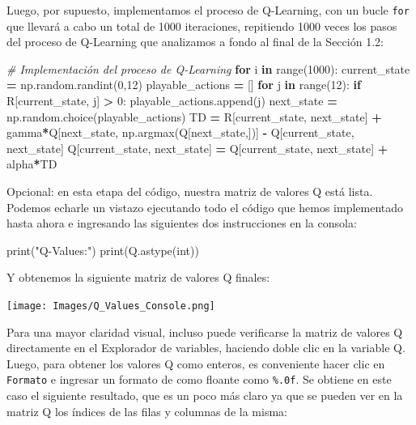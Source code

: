 \documentclass[
]{book}
\newenvironment{Shaded}{\begin{snugshade}}{\end{snugshade}}
\newcommand{\BuiltInTok}[1]{#1}
\newcommand{\CommentTok}[1]{\textcolor[rgb]{0.56,0.35,0.01}{\textit{#1}}}
\newcommand{\ControlFlowTok}[1]{\textcolor[rgb]{0.13,0.29,0.53}{\textbf{#1}}}
\newcommand{\DecValTok}[1]{\textcolor[rgb]{0.00,0.00,0.81}{#1}}
\newcommand{\KeywordTok}[1]{\textcolor[rgb]{0.13,0.29,0.53}{\textbf{#1}}}
\newcommand{\NormalTok}[1]{#1}
\newcommand{\OperatorTok}[1]{\textcolor[rgb]{0.81,0.36,0.00}{\textbf{#1}}}
\newcommand{\StringTok}[1]{\textcolor[rgb]{0.31,0.60,0.02}{#1}}
\begin{document}
Luego, por supuesto, implementamos el proceso de Q-Learning, con un bucle \texttt{for} que llevará a cabo un total de 1000 iteraciones, repitiendo 1000 veces los pasos del proceso de Q-Learning que analizamos a fondo al final de la Sección 1.2:

\begin{Shaded}
\begin{Highlighting}[]
\CommentTok{\# Implementación del proceso de Q{-}Learning}
\ControlFlowTok{for}\NormalTok{ i }\KeywordTok{in} \BuiltInTok{range}\NormalTok{(}\DecValTok{1000}\NormalTok{):}
\NormalTok{    current\_state }\OperatorTok{=}\NormalTok{ np.random.randint(}\DecValTok{0}\NormalTok{,}\DecValTok{12}\NormalTok{)}
\NormalTok{    playable\_actions }\OperatorTok{=}\NormalTok{ []}
    \ControlFlowTok{for}\NormalTok{ j }\KeywordTok{in} \BuiltInTok{range}\NormalTok{(}\DecValTok{12}\NormalTok{):}
        \ControlFlowTok{if}\NormalTok{ R[current\_state, j] }\OperatorTok{\textgreater{}} \DecValTok{0}\NormalTok{:}
\NormalTok{            playable\_actions.append(j)}
\NormalTok{    next\_state }\OperatorTok{=}\NormalTok{ np.random.choice(playable\_actions)}
\NormalTok{    TD }\OperatorTok{=}\NormalTok{ R[current\_state, next\_state] }\OperatorTok{+}\NormalTok{ gamma}\OperatorTok{*}\NormalTok{Q[next\_state, np.argmax(Q[next\_state,])]}
         \OperatorTok{{-}}\NormalTok{ Q[current\_state, next\_state]}
\NormalTok{    Q[current\_state, next\_state] }\OperatorTok{=}\NormalTok{ Q[current\_state, next\_state] }\OperatorTok{+}\NormalTok{ alpha}\OperatorTok{*}\NormalTok{TD}
\end{Highlighting}
\end{Shaded}

Opcional: en esta etapa del código, nuestra matriz de valores Q está lista. Podemos echarle un vistazo ejecutando todo el código que hemos implementado hasta ahora e ingresando las siguientes dos instrucciones en la consola:

\begin{Shaded}
\begin{Highlighting}[]
\BuiltInTok{print}\NormalTok{(}\StringTok{"Q{-}Values:"}\NormalTok{)}
\BuiltInTok{print}\NormalTok{(Q.astype(}\BuiltInTok{int}\NormalTok{))}
\end{Highlighting}
\end{Shaded}

Y obtenemos la siguiente matriz de valores Q finales:

\texttt{[image: Images/Q\_Values\_Console.png]}

Para una mayor claridad visual, incluso puede verificarse la matriz de valores Q directamente en el Explorador de variables, haciendo doble clic en la variable Q. Luego, para obtener los valores Q como enteros, es conveniente hacer clic en \texttt{Formato} e ingresar un formato de como floante como \texttt{\%.0f}. Se obtiene en este caso el siguiente resultado, que es un poco más claro ya que se pueden ver en la matriz Q los índices de las filas y columnas de la misma:
\end{document}
